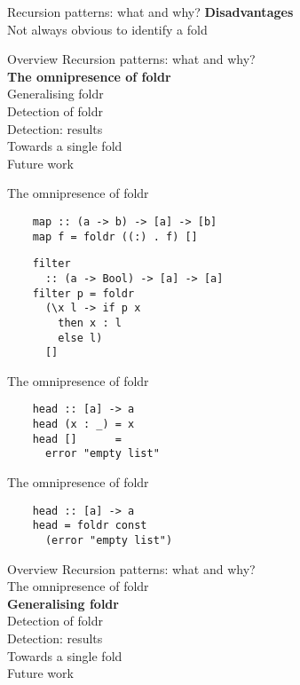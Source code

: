 \documentclass[20pt]{beamer}
\begin{document}
\begin{frame}{Recursion patterns: what and why?}
    \textbf{Disadvantages} \\
    Not always obvious to identify a fold
\end{frame}


\begin{frame}{Overview}
    Recursion patterns: what and why? \\
    \textbf{The omnipresence of foldr} \\
    Generalising foldr \\
    Detection of foldr \\
    Detection: results \\
    Towards a single fold \\
    Future work \\
\end{frame}

\begin{frame}[fragile]{The omnipresence of foldr}
    \begin{lstlisting}
    map :: (a -> b) -> [a] -> [b]
    map f = foldr ((:) . f) []
    \end{lstlisting}

    \begin{lstlisting}
    filter
      :: (a -> Bool) -> [a] -> [a]
    filter p = foldr
      (\x l -> if p x
        then x : l
        else l)
      []
    \end{lstlisting}
\end{frame}

\begin{frame}[fragile]{The omnipresence of foldr}
    \begin{lstlisting}
    head :: [a] -> a
    head (x : _) = x
    head []      =
      error "empty list"
    \end{lstlisting}
\end{frame}

\begin{frame}[fragile]{The omnipresence of foldr}
    \begin{lstlisting}
    head :: [a] -> a
    head = foldr const
      (error "empty list")
    \end{lstlisting}
\end{frame}


\begin{frame}{Overview}
    Recursion patterns: what and why? \\
    The omnipresence of foldr \\
    \textbf{Generalising foldr} \\
    Detection of foldr \\
    Detection: results \\
    Towards a single fold \\
    Future work \\
\end{frame}
\end{document}
